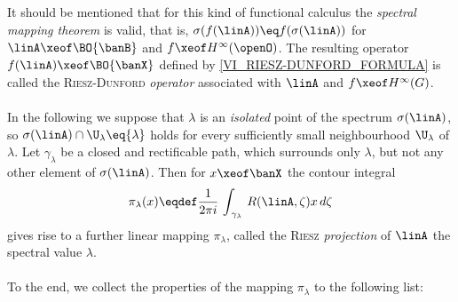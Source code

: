 \documentclass[11pt,twoside]{article}
\def\G{G}
\begin{document}
\subparagraph{}
It should be mentioned 
that for this kind of functional calculus the
\textit{spectral mapping theorem} is valid,
that is,
$\sigma(f(\linA)) \eq f(\sigma(\linA))$
for $\linA \xeof \BO{\banB}$ and $f \xeof H^{\infty}(\openO)$.
The resulting operator $f(\linA) \xeof \BO{\banX}$
defined by \eqref{VI_RIESZ-DUNFORD_FORMULA}
is called the \textsc{Riesz-Dunford} \textit{operator}
associated with $\linA$ and $f \xeof H^{\infty}(\G)$.

\paragraph{} %
In the following we suppose that
$\lambda$ is an \textit{isolated} point of the spectrum $\sigma(\linA)$,
so $\sigma(\linA) \cap \U_{\lambda} \eq \{\lambda\}$ holds
for every sufficiently small neighbourhood $\U_{\lambda}$ of $\lambda$.
Let $\gamma_{\lambda}$ be a closed and rectificable path,
which surrounds only $\lambda$,
but not any other element of $\sigma(\linA)$.
Then for $x \xeof \banX$ the contour integral
\[
\pi_{\lambda}(x) \eqdef
\frac{1}{2 \pi i} \, \int_{\,\gamma_{\lambda}} \, R(\linA,\zeta) x \, d\zeta
\]
gives rise to a further linear mapping $\pi_{\lambda}$,
called the \textsc{Riesz} \textit{projection} of $\linA$
{\wrt} the spectral value $\lambda$.

\paragraph{} %
To the end,
we collect the properties of the mapping $\pi_{\lambda}$ to the following list:
\end{document}
